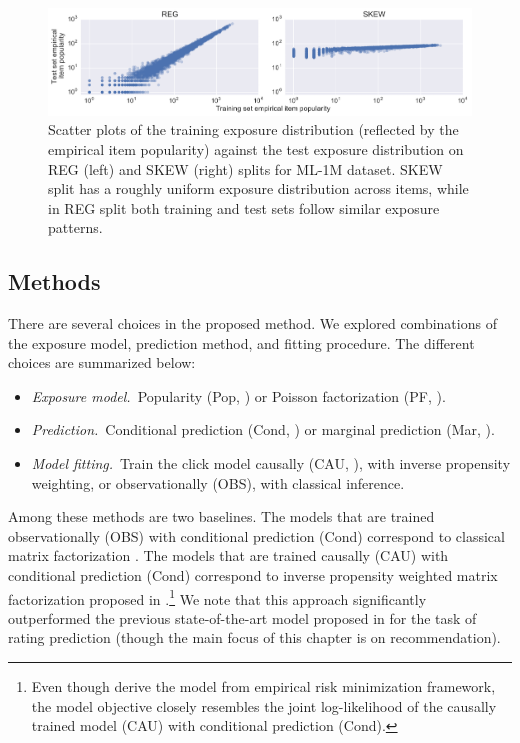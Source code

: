 
\begin{figure}[!ht]
  \centering
    \includegraphics[width=\textwidth]{fig/tr_vs_te}
    \caption{Scatter plots of the training exposure distribution
      (reflected by the empirical item popularity) against the test
      exposure distribution on REG (left) and SKEW (right) splits for
      ML-1M dataset. SKEW split has a roughly uniform exposure
      distribution across items, while in REG split both training and
      test sets follow similar exposure patterns. }
   \label{fig:tr_vs_te}
\end{figure}

\subsection{Methods}

There are several choices in the proposed method.  We explored
combinations of the exposure model, prediction method, and fitting
procedure.  The different choices are summarized below:
\begin{itemize}
\item \textit{Exposure model.\,}
  Popularity (Pop, ) or
  Poisson factorization (PF, ).

\item \textit{Prediction.\,} Conditional prediction (Cond, ) or marginal
  prediction (Mar, ).

\item \textit{Model fitting.\,} Train the click model causally (CAU,
  ), with inverse propensity weighting, or
  observationally (OBS), with
  classical inference.
\end{itemize}

Among these methods are two baselines. The models that are trained
observationally (OBS) with conditional prediction (Cond) correspond to
classical matrix factorization \citep{salakhutdinov2008probabilistic}. The models that
are trained causally (CAU) with conditional prediction (Cond)
correspond to inverse propensity weighted matrix factorization
proposed in \citet{schnabel16treatment}.\footnote{Even though
  \citet{schnabel16treatment} derive the model from empirical risk
  minimization framework, the model objective closely resembles the
  joint log-likelihood of the causally trained model (CAU) with
  conditional prediction (Cond).} We note that this approach
significantly outperformed the previous state-of-the-art model
proposed in \citet{HernandezLobato14nmar} for the task of rating
prediction (though the main focus of this chapter is on recommendation).

